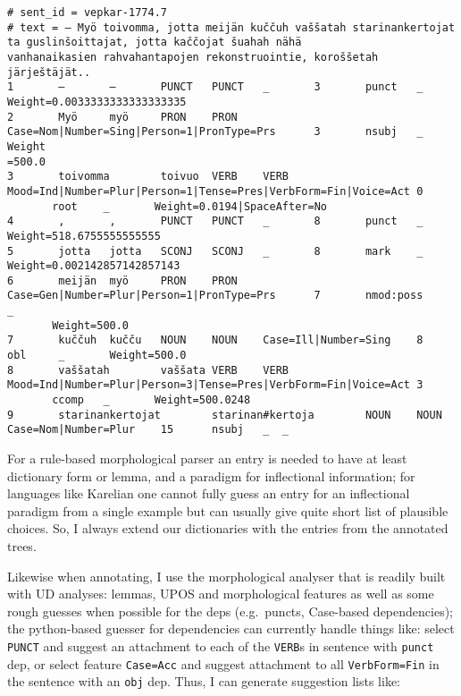\documentclass{flammie}
\begin{document}
\begin{scriptsize}
\begin{verbatim}
# sent_id = vepkar-1774.7
# text = – Myö toivomma, jotta meijän kuččuh vaššatah starinankertojat ta guslinšoittajat, jotta kaččojat šuahah nähä
vanhanaikasien rahvahantapojen rekonstruointie, koroššetah järještäjät..
1       –       –       PUNCT   PUNCT   _       3       punct   _       Weight=0.0033333333333333335
2       Myö     myö     PRON    PRON    Case=Nom|Number=Sing|Person=1|PronType=Prs      3       nsubj   _       Weight
=500.0
3       toivomma        toivuo  VERB    VERB    Mood=Ind|Number=Plur|Person=1|Tense=Pres|VerbForm=Fin|Voice=Act 0
       root    _       Weight=0.0194|SpaceAfter=No
4       ,       ,       PUNCT   PUNCT   _       8       punct   _       Weight=518.6755555555555
5       jotta   jotta   SCONJ   SCONJ   _       8       mark    _       Weight=0.002142857142857143
6       meijän  myö     PRON    PRON    Case=Gen|Number=Plur|Person=1|PronType=Prs      7       nmod:poss       _
       Weight=500.0
7       kuččuh  kučču   NOUN    NOUN    Case=Ill|Number=Sing    8       obl     _       Weight=500.0
8       vaššatah        vaššata VERB    VERB    Mood=Ind|Number=Plur|Person=3|Tense=Pres|VerbForm=Fin|Voice=Act 3
       ccomp   _       Weight=500.0248
9       starinankertojat        starinan#kertoja        NOUN    NOUN Case=Nom|Number=Plur    15      nsubj   _  _
\end{verbatim}
\end{scriptsize}

For a rule-based morphological parser an entry is needed to have at least
dictionary form or lemma, and a paradigm for inflectional information; for
languages like Karelian one cannot fully guess an entry for an inflectional
paradigm from a single example but can usually give quite short list of
plausible choices. So, I always extend our dictionaries with the entries from
the annotated trees.


Likewise when annotating, I use the morphological analyser that is readily
built with UD analyses: lemmas, UPOS and morphological features as well as
some rough guesses when possible for the deps (e.g.\ puncts, Case-based
dependencies); the python-based guesser for dependencies can currently handle
things like: select \texttt{PUNCT} and suggest an attachment to each of the
\texttt{VERB}s in sentence with \texttt{punct} dep,
or select feature \texttt{Case=Acc} and suggest attachment to all
\texttt{VerbForm=Fin} in the sentence with an \texttt{obj} dep.
Thus, I can generate suggestion lists like:
\end{document}
